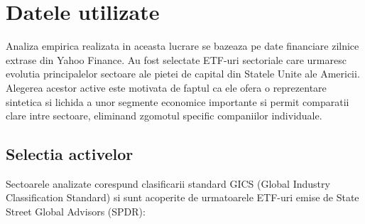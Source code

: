 \chapter{Datele utilizate}

Analiza empirica realizata in aceasta lucrare se bazeaza pe date financiare zilnice
extrase din Yahoo Finance. Au fost selectate ETF-uri sectoriale care urmaresc
evolutia principalelor sectoare ale pietei de capital din Statele Unite ale
Americii. Alegerea acestor active este motivata de faptul ca ele ofera o
reprezentare sintetica si lichida a unor segmente economice importante si permit
comparatii clare intre sectoare, eliminand zgomotul specific companiilor individuale.

\section{Selectia activelor}

Sectoarele analizate corespund clasificarii standard GICS (Global Industry
Classification Standard) \citep{gics2024} si sunt acoperite de urmatoarele ETF-uri emise de
State Street Global Advisors (SPDR):

